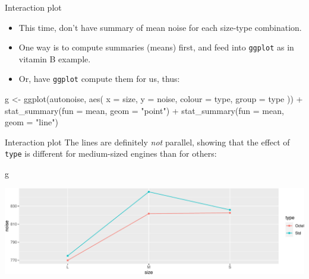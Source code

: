 \documentclass[
  ignorenonframetext,
]{beamer}
\newenvironment{Shaded}{\begin{snugshade}}{\end{snugshade}}
\newcommand{\AttributeTok}[1]{\textcolor[rgb]{0.40,0.45,0.13}{#1}}
\newcommand{\FunctionTok}[1]{\textcolor[rgb]{0.28,0.35,0.67}{#1}}
\newcommand{\NormalTok}[1]{\textcolor[rgb]{0.00,0.23,0.31}{#1}}
\newcommand{\OtherTok}[1]{\textcolor[rgb]{0.00,0.23,0.31}{#1}}
\newcommand{\SpecialCharTok}[1]{\textcolor[rgb]{0.37,0.37,0.37}{#1}}
\newcommand{\StringTok}[1]{\textcolor[rgb]{0.13,0.47,0.30}{#1}}
\begin{document}
\begin{frame}[fragile]{Interaction plot}
\protect\hypertarget{interaction-plot-1}{}
\begin{itemize}
\item
  This time, don't have summary of mean noise for each size-type
  combination.
\item
  One way is to compute summaries (means) first, and feed into
  \texttt{ggplot} as in vitamin B example.
\item
  Or, have \texttt{ggplot} compute them for us, thus:
\end{itemize}

\begin{Shaded}
\begin{Highlighting}[]
\NormalTok{g }\OtherTok{\textless{}{-}} \FunctionTok{ggplot}\NormalTok{(autonoise, }\FunctionTok{aes}\NormalTok{(}
  \AttributeTok{x =}\NormalTok{ size, }\AttributeTok{y =}\NormalTok{ noise,}
  \AttributeTok{colour =}\NormalTok{ type, }\AttributeTok{group =}\NormalTok{ type}
\NormalTok{)) }\SpecialCharTok{+}
  \FunctionTok{stat\_summary}\NormalTok{(}\AttributeTok{fun =}\NormalTok{ mean, }\AttributeTok{geom =} \StringTok{"point"}\NormalTok{) }\SpecialCharTok{+}
  \FunctionTok{stat\_summary}\NormalTok{(}\AttributeTok{fun =}\NormalTok{ mean, }\AttributeTok{geom =} \StringTok{"line"}\NormalTok{)}
\end{Highlighting}
\end{Shaded}
\end{frame}

\begin{frame}[fragile]{Interaction plot}
\protect\hypertarget{interaction-plot-2}{}
The lines are definitely \emph{not} parallel, showing that the effect of
\texttt{type} is different for medium-sized engines than for others:

\begin{Shaded}
\begin{Highlighting}[]
\NormalTok{g}
\end{Highlighting}
\end{Shaded}

\includegraphics{anova_files/figure-beamer/bAnova-30-1.pdf}
\end{frame}
\end{document}
